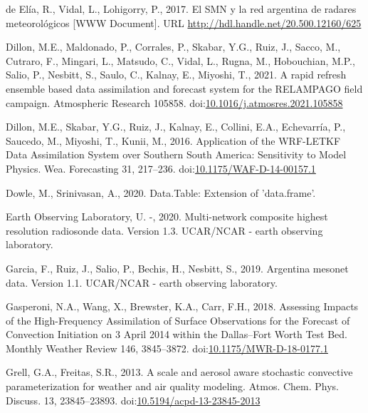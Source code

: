 \documentclass[final,5p,times,twocolumn,authoryear]{elsarticle} %
\begin{document}
\leavevmode\hypertarget{ref-deelia2017}{}%
de Elía, R., Vidal, L., Lohigorry, P., 2017. El SMN y la red argentina de radares meteorológicos {[}WWW Document{]}. URL \url{http://hdl.handle.net/20.500.12160/625}

\leavevmode\hypertarget{ref-dillon2021}{}%
Dillon, M.E., Maldonado, P., Corrales, P., Skabar, Y.G., Ruiz, J., Sacco, M., Cutraro, F., Mingari, L., Matsudo, C., Vidal, L., Rugna, M., Hobouchian, M.P., Salio, P., Nesbitt, S., Saulo, C., Kalnay, E., Miyoshi, T., 2021. A rapid refresh ensemble based data assimilation and forecast system for the RELAMPAGO field campaign. Atmospheric Research 105858. doi:\href{https://doi.org/10.1016/j.atmosres.2021.105858}{10.1016/j.atmosres.2021.105858}

\leavevmode\hypertarget{ref-dillon2016}{}%
Dillon, M.E., Skabar, Y.G., Ruiz, J., Kalnay, E., Collini, E.A., Echevarría, P., Saucedo, M., Miyoshi, T., Kunii, M., 2016. Application of the WRF-LETKF Data Assimilation System over Southern South America: Sensitivity to Model Physics. Wea. Forecasting 31, 217--236. doi:\href{https://doi.org/10.1175/WAF-D-14-00157.1}{10.1175/WAF-D-14-00157.1}

\leavevmode\hypertarget{ref-dowle2020}{}%
Dowle, M., Srinivasan, A., 2020. Data.Table: Extension of 'data.frame'.

\leavevmode\hypertarget{ref-sondeos}{}%
Earth Observing Laboratory, U. -, 2020. Multi-network composite highest resolution radiosonde data. Version 1.3. UCAR/NCAR - earth observing laboratory.

\leavevmode\hypertarget{ref-garcia2019}{}%
Garcia, F., Ruiz, J., Salio, P., Bechis, H., Nesbitt, S., 2019. Argentina mesonet data. Version 1.1. UCAR/NCAR - earth observing laboratory.

\leavevmode\hypertarget{ref-gasperoni2018}{}%
Gasperoni, N.A., Wang, X., Brewster, K.A., Carr, F.H., 2018. Assessing Impacts of the High-Frequency Assimilation of Surface Observations for the Forecast of Convection Initiation on 3 April 2014 within the Dallas--Fort Worth Test Bed. Monthly Weather Review 146, 3845--3872. doi:\href{https://doi.org/10.1175/MWR-D-18-0177.1}{10.1175/MWR-D-18-0177.1}

\leavevmode\hypertarget{ref-grell2013}{}%
Grell, G.A., Freitas, S.R., 2013. A scale and aerosol aware stochastic convective parameterization for weather and air quality modeling. Atmos. Chem. Phys. Discuss. 13, 23845--23893. doi:\href{https://doi.org/10.5194/acpd-13-23845-2013}{10.5194/acpd-13-23845-2013}
\end{document}
